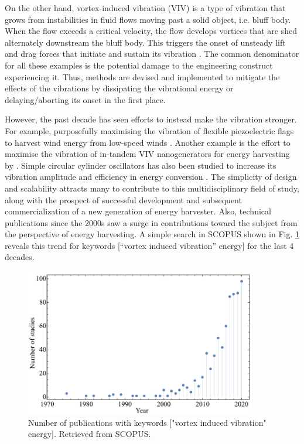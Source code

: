 \documentclass[oneside]{utmthesis}
\begin{document}
On the other hand, vortex-induced vibration (VIV) is a type of vibration that grows from instabilities in fluid flows moving past a solid object, i.e. bluff body. When the flow exceeds a critical velocity, the flow develops vortices that are shed alternately downstream the bluff body. This triggers the onset of unsteady lift and drag forces that initiate and sustain its vibration \citep{Bukka2020}. The common denominator for all these examples is the potential damage to the engineering construct experiencing it. Thus, methods are devised and implemented to mitigate the effects of the vibrations by dissipating the vibrational energy or delaying/aborting its onset in the first place.

However, the past decade has seen efforts to instead make the vibration stronger. For example, purposefully maximising the vibration of flexible piezoelectric flags to harvest wind energy from low-speed winds \citep{Mehdipour2022}. Another example is the effort to maximise the vibration of in-tandem VIV nanogenerators for energy harvesting by \citep{Zhang2022a}. Simple circular cylinder oscillators has also been studied to increase its vibration amplitude and efficiency in energy conversion \citep{Zhang2022b}.
The simplicity of design and scalability attracts many to contribute to this multidisciplinary field of study, along with the prospect of successful development and subsequent commercialization of a new generation of energy harvester.
Also, technical publications since the 2000s saw a surge in contributions toward the subject from the perspective of energy harvesting. A simple search in SCOPUS shown in Fig. \ref{fig:scopusTrend} reveals this trend for keywords [“vortex induced vibration” energy] for the last 4 decades.

\begin{figure}[!h]
  \centering
  \includegraphics[width=0.9\textwidth]{figs/scopusTrend}
  \caption{Number of publications with keywords ["vortex induced vibration" energy]. Retrieved from SCOPUS.}
  \label{fig:scopusTrend}
\end{figure}
\end{document}
